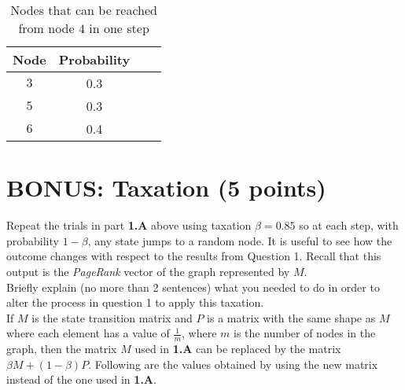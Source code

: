 \documentclass[11pt]{article}
\begin{document}
    \begin{table}[!h] 
    \centering
    \label{6E}
    \caption{Nodes that can be reached from node $4$ in one step}
    \begin{tabular}{|c|c|c|c|}
      \hline
    Node & Probability \\
      \hline        
    $3$ & 0.3\\
      \hline
    $5$ & 0.3\\
      \hline
    $6$ & 0.4\\
      \hline
    \end{tabular}
\end{table}

\section{BONUS: Taxation (5 points)}
Repeat the trials in part \textbf{1.A} above using taxation $\beta = 0.85$ so at each step, with probability $1 - \beta$, any state jumps to a random node. It is useful to see how the outcome changes with respect to the results from Question 1. Recall that this output is the \textit{PageRank} vector of the graph represented by $M$.\\
Briefly explain (no more than 2 sentences) what you needed to do in order to alter the process in question 1 to apply this taxation.\\

If $M$ is the state transition matrix and $P$ is a matrix with the same shape as $M$ where each element has a value of $\frac{1}{m}$, where $m$ is the number of nodes in the graph, then the matrix $M$ used in \textbf{1.A} can be replaced by the matrix $\beta M + (1-\beta)P$. Following are the values obtained by using the new matrix instead of the one used in \textbf{1.A}.
\end{document}

